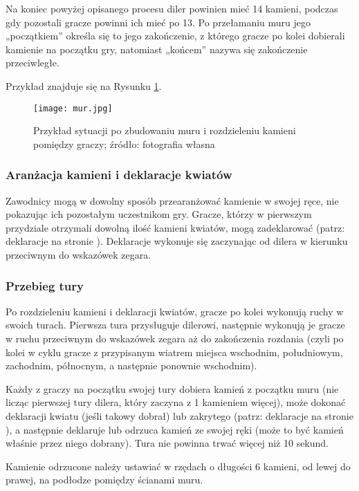 Na koniec powyżej opisanego procesu diler powinien mieć 14 kamieni, podczas gdy
pozostali gracze powinni ich mieć po 13. Po przełamaniu muru jego „początkiem”
określa się to jego zakończenie, z którego gracze po kolei dobierali kamienie na
początku gry, natomiast „końcem” nazywa się zakończenie przeciwległe.

Przykład znajduje się na Rysunku \ref{fig:mur}.

\begin{figure}[H]
\centering
\texttt{[image: mur.jpg]}
\caption{Przykład sytuacji po zbudowaniu muru i rozdzieleniu kamieni pomiędzy
graczy; źródło: fotografia własna}
\label{fig:mur}
\end{figure}

\subsubsection{Aranżacja kamieni i deklaracje kwiatów}
Zawodnicy mogą w dowolny sposób przearanżować kamienie w swojej ręce, nie
pokazując ich pozostałym uczestnikom gry. Gracze, którzy w pierwszym przydziale
otrzymali dowolną ilość kamieni kwiatów, mogą zadeklarować  (patrz:
deklaracje na stronie \pageref{deklaracje}). Deklaracje
wykonuje się zaczynając od dilera w kierunku przeciwnym do wskazówek zegara.  
 
\subsubsection{Przebieg tury}
Po rozdzieleniu kamieni i deklaracji kwiatów,  gracze po kolei wykonują ruchy w
swoich turach. Pierwsza tura przysługuje dilerowi, następnie wykonują je gracze
w ruchu przeciwnym do wskazówek zegara aż do zakończenia rozdania (czyli po
kolei w cyklu gracze z przypisanym wiatrem miejsca wschodnim, południowym,
zachodnim, północnym, a następnie ponownie wschodnim).

Każdy z graczy na początku swojej tury dobiera kamień z początku muru (nie
licząc pierwszej tury dilera, który zaczyna z 1 kamieniem więcej), może dokonać
deklaracji kwiatu (jeśli takowy dobrał) lub zakrytego  (patrz:
deklaracje na stronie \pageref{deklaracje}), a następnie deklaruje 
lub odrzuca kamień ze swojej ręki (może to być kamień właśnie przez niego dobrany). Tura
nie powinna trwać więcej niż 10 sekund.

Kamienie odrzucone należy ustawiać w rzędach o długości 6 kamieni, od lewej do
prawej, na podłodze pomiędzy ścianami muru. 

